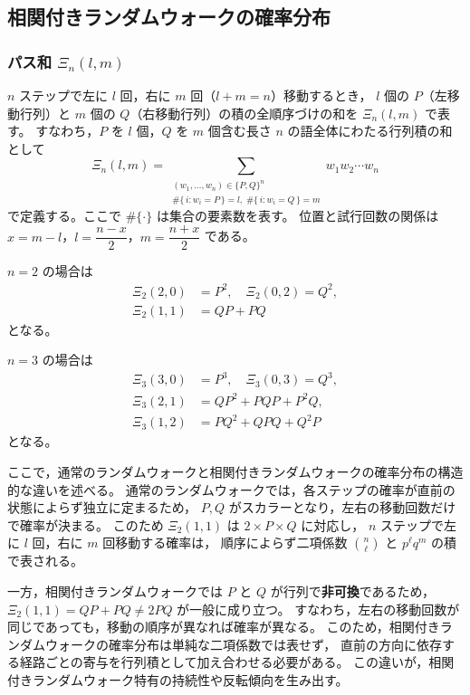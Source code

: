 \documentclass[a4j,dvipdfmx]{jsarticle}
\theoremstyle{plainnote}
\begin{document}
\subsection{相関付きランダムウォークの確率分布}

\subsubsection*{パス和 $\Xi_n(l,m)$}

$n$ ステップで左に $l$ 回，右に $m$ 回（$l + m = n$）移動するとき，
$l$ 個の $P$（左移動行列）と $m$ 個の $Q$（右移動行列）の積の全順序づけの和を
$\Xi_n(l, m)$ で表す。
すなわち，$P$ を $l$ 個，$Q$ を $m$ 個含む長さ $n$ の語全体にわたる行列積の和として
\begin{equation}
  \Xi_n(l, m)
  = \sum_{\substack{(w_1,\ldots,w_n)\in\{P,Q\}^n \\
        \#\{\,i : w_i = P\,\}=l,\;\#\{\,i : w_i = Q\,\}=m}}
    w_1 w_2 \cdots w_n
  \label{eq:path_sum}
\end{equation}
で定義する。ここで $\#\{\cdot\}$ は集合の要素数を表す。
位置と試行回数の関係は $x = m - l$，$l = \dfrac{n-x}{2}$，$m = \dfrac{n+x}{2}$ である。

$n = 2$ の場合は
\begin{align*}
  \Xi_2(2,0) &= P^2, \quad \Xi_2(0,2) = Q^2, \\
  \Xi_2(1,1) &= QP + PQ
\end{align*}
となる。

$n = 3$ の場合は
\begin{align*}
  \Xi_3(3,0) &= P^3, \quad \Xi_3(0,3) = Q^3, \\
  \Xi_3(2,1) &= QP^2 + PQP + P^2Q, \\
  \Xi_3(1,2) &= PQ^2 + QPQ + Q^2P
\end{align*}
となる。

ここで，通常のランダムウォークと相関付きランダムウォークの確率分布の構造的な違いを述べる。
通常のランダムウォークでは，各ステップの確率が直前の状態によらず独立に定まるため，
$P, Q$ がスカラーとなり，左右の移動回数だけで確率が決まる。
このため $\Xi_2(1,1)$ は $2 \times P \times Q$ に対応し，
$n$ ステップで左に $l$ 回，右に $m$ 回移動する確率は，
順序によらず二項係数 $\binom{n}{\ell}$ と $p^\ell q^m$ の積で表される。

一方，相関付きランダムウォークでは $P$ と $Q$ が行列で\textbf{非可換}であるため，
$\Xi_2(1,1) = QP + PQ \neq 2PQ$ が一般に成り立つ。
すなわち，左右の移動回数が同じであっても，移動の順序が異なれば確率が異なる。
このため，相関付きランダムウォークの確率分布は単純な二項係数では表せず，
直前の方向に依存する経路ごとの寄与を行列積として加え合わせる必要がある。
この違いが，相関付きランダムウォーク特有の持続性や反転傾向を生み出す。
\end{document}
